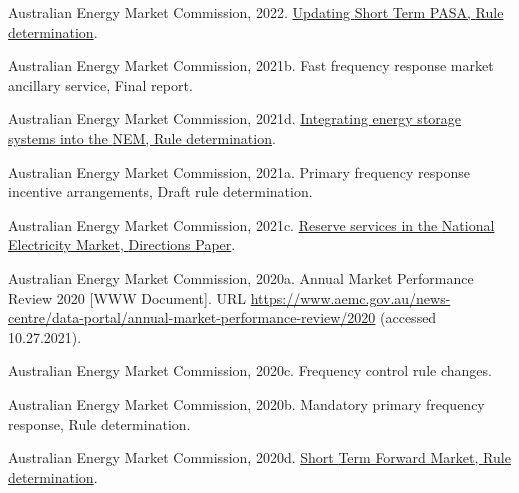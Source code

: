 \documentclass[12pt,a4paper,]{report}
\newlength{\cslhangindent}
\newenvironment{CSLReferences}[2] %
 {%
  \setlength{\parindent}{0pt}
  \ifodd #1 \everypar{\setlength{\hangindent}{\cslhangindent}}\ignorespaces\fi
  \ifnum #2 > 0
  \setlength{\parskip}{#2\baselineskip}
  \fi
 }%
 {}
\begin{document}
\begin{CSLReferences}{1}{0}
\leavevmode{}%
Australian Energy Market Commission, 2022.
\href{https://www.aemc.gov.au/sites/default/files/2022-05/ERC0332\%20-\%20Updating\%20Short\%20Term\%20PASA\%20-\%20Final\%20determination.pdf}{Updating
{Short Term PASA}, {Rule} determination}.

\leavevmode{}%
Australian Energy Market Commission, 2021b. Fast frequency response
market ancillary service, {Final} report.

\leavevmode{}%
Australian Energy Market Commission, 2021d.
\href{https://www.aemc.gov.au/sites/default/files/2021-12/1._final_determination_-_integrating_energy_storage_systems_into_the_nem.pdf}{Integrating
energy storage systems into the {NEM}, {Rule} determination}.

\leavevmode{}%
Australian Energy Market Commission, 2021a. Primary frequency response
incentive arrangements, {Draft} rule determination.

\leavevmode{}%
Australian Energy Market Commission, 2021c.
\href{https://www.aemc.gov.au/sites/default/files/2021-01/Reserve\%20services\%20directions\%20paper\%20-\%205.01.2021\%20-\%20FINAL.pdf}{Reserve
services in the {National Electricity Market}, {Directions Paper}}.

\leavevmode{}%
Australian Energy Market Commission, 2020a. Annual {Market Performance
Review} 2020 {[}WWW Document{]}. URL
\url{https://www.aemc.gov.au/news-centre/data-portal/annual-market-performance-review/2020}
(accessed 10.27.2021).

\leavevmode{}%
Australian Energy Market Commission, 2020c. Frequency control rule
changes.

\leavevmode{}%
Australian Energy Market Commission, 2020b. Mandatory primary frequency
response, {Rule} determination.

\leavevmode{}%
Australian Energy Market Commission, 2020d.
\href{https://www.aemc.gov.au/sites/default/files/documents/final_determination_-_short_term_forward_market_-_clean.pdf}{Short
{Term Forward Market}, {Rule} determination}.


\end{CSLReferences}
\end{document}
